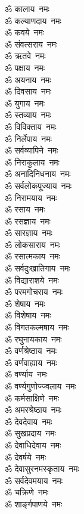 \begin{multicols}{2}
\begin{flushleft}
ॐ कालाय~नमः\\
ॐ कल्याणदाय~नमः\hfill{}\\
ॐ कवये~नमः\\
ॐ संवत्सराय~नमः\\
ॐ ऋतवे~नमः\\
ॐ पक्षाय~नमः\\
ॐ अयनाय~नमः\\
ॐ दिवसाय~नमः\\
ॐ युगाय~नमः\\
ॐ स्तव्याय~नमः\\
ॐ विविक्ताय~नमः\\
ॐ निर्लेपाय~नमः\hfill{}\\
ॐ सर्वव्यापिने~नमः\\
ॐ निराकुलाय~नमः\\
ॐ अनादिनिधनाय~नमः\\
ॐ सर्वलोकपूज्याय~नमः\\
ॐ निरामयाय~नमः\\
ॐ रसाय~नमः\\
ॐ रसज्ञाय~नमः\\
ॐ सारज्ञाय~नमः\\
ॐ लोकसाराय~नमः\\
ॐ रसात्मकाय~नमः\hfill{}\\
ॐ सर्वदुःखातिगाय~नमः\\
ॐ विद्याराशये~नमः\\
ॐ परमगोचराय~नमः\\
ॐ शेषाय~नमः\\
ॐ विशेषाय~नमः\\
ॐ विगतकल्मषाय~नमः\\
ॐ रघुनायकाय~नमः\\
ॐ वर्णश्रेष्ठाय~नमः\\
ॐ वर्णवाह्याय~नमः\\
ॐ वर्ण्याय~नमः\hfill{}\\
ॐ वर्ण्यगुणोज्ज्वलाय~नमः\\
ॐ कर्मसाक्षिणे~नमः\\
ॐ अमरश्रेष्ठाय~नमः\\
ॐ देवदेवाय~नमः\\
ॐ सुखप्रदाय~नमः\\
ॐ देवाधिदेवाय~नमः\\
ॐ देवर्षये~नमः\\
ॐ देवासुरनमस्कृताय~नमः\\
ॐ सर्वदेवमयाय~नमः\\
ॐ चक्रिणे~नमः\hfill{}\\
ॐ शार्ङ्गपाणये~नमः\\

\end{flushleft}
\end{multicols}
